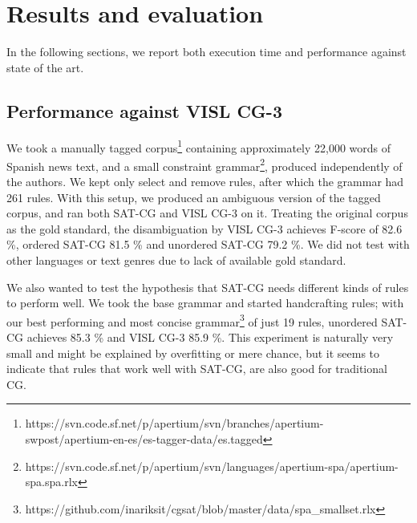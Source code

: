 \documentclass[11pt]{article}
\begin{document}
\section{Results and evaluation}
\label{sec:eval}

In the following sections, we report both execution time and
performance against state of the art.




\subsection{Performance against VISL CG-3}


We took a manually tagged
corpus\footnote{https://svn.code.sf.net/p/apertium/svn/branches/apertium-swpost/apertium-en-es/es-tagger-data/es.tagged}
containing approximately 22,000 words of Spanish news text, 
and a small constraint grammar\footnote{https://svn.code.sf.net/p/apertium/svn/languages/apertium-spa/apertium-spa.spa.rlx}, produced independently of the authors.
We kept only select and remove rules, after which the grammar had 261 rules.
With this setup, we produced an ambiguous version of the tagged
corpus, and ran both SAT-CG and VISL CG-3 on it.
Treating the original corpus as the gold standard, the disambiguation
by  VISL CG-3 achieves F-score of 82.6 \%, ordered SAT-CG 81.5 \%  and
unordered SAT-CG 79.2 \%. 
We did not test with other languages or text genres due to lack of
available gold standard.

We also wanted to test the hypothesis that SAT-CG needs different
kinds of rules to perform well. We took the base grammar and started
handcrafting rules; with our best performing and most concise
grammar\footnote{https://github.com/inariksit/cgsat/blob/master/data/spa\_smallset.rlx}
of just 19 rules, unordered SAT-CG achieves 85.3 \% and VISL CG-3 85.9
\%. This experiment is naturally very small and might be explained by
overfitting or mere chance, but it seems to indicate that rules that
work well with SAT-CG, are also good for traditional CG.
\end{document}

